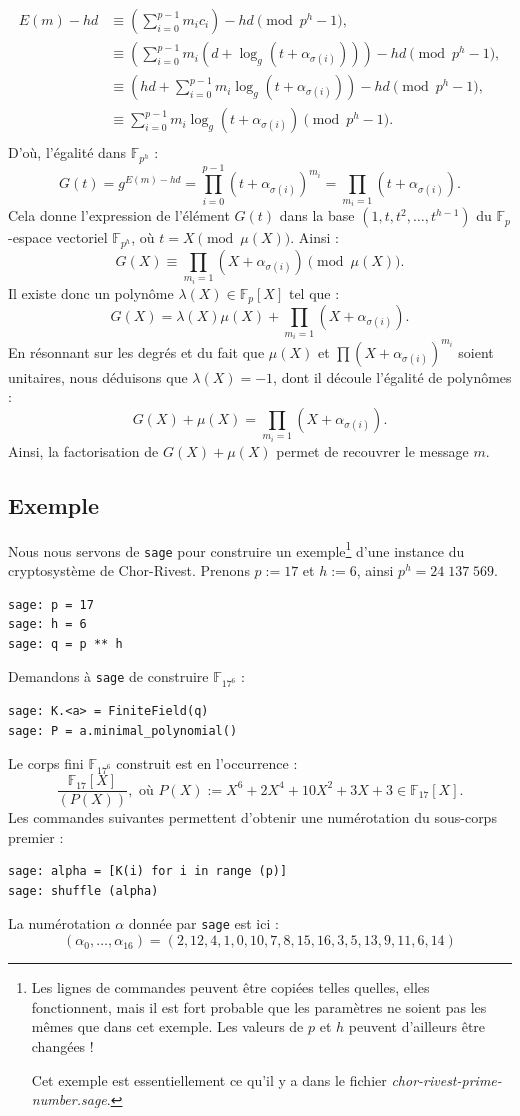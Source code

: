 \documentclass[a4paper, titlepage, 11pt]{article}
\theoremstyle{definition}
\theoremstyle{remark}
\def\gf #1{\mathbb{F}_{#1}}
\begin{document}
\begin{align*}
E(m) - hd &\equiv \left(\sum_{i=0}^{p-1} m_ic_i\right) - hd \pmod{p^h-1}, \\
&\equiv \left(\sum_{i=0}^{p-1} m_i\left(d + \log_g\left(t + \alpha_{\sigma(i)}\right)\right)\right) - hd \pmod{p^h-1}, \\
&\equiv \left(hd + \sum_{i=0}^{p-1} m_i\log_g\left(t + \alpha_{\sigma(i)}\right)\right) - hd \pmod{p^h-1}, \\
&\equiv  \sum_{i=0}^{p-1} m_i\log_g\left(t + \alpha_{\sigma(i)}\right) \pmod{p^h-1}. \\
\end{align*}
D'où, l'égalité dans $\gf{p^h}$ :
$$G(t) = g^{E(m) - hd} = \prod_{i=0}^{p-1} \left(t+\alpha_{\sigma(i)}\right)^{m_i} = \prod_{m_i = 1} \left(t+\alpha_{\sigma(i)}\right).$$
Cela donne l'expression de l'élément $G(t)$ dans la base $(1,t,t^2, \dots, t^{h-1})$ du $\gf{p}$-espace vectoriel $\gf{p^h}$, où $t = X \pmod{\mu(X)}$. Ainsi :
$$G(X) \equiv \prod_{m_i = 1} \left(X+\alpha_{\sigma(i)}\right) \pmod{\mu(X)}.$$
Il existe donc un polynôme $\lambda(X) \in \gf{p}[X]$ tel que : $$G(X) = \lambda(X) \mu(X) + \prod_{m_i = 1} \left(X+\alpha_{\sigma(i)}\right).$$
En résonnant sur les degrés et du fait que $\mu(X)$ et $\prod \left(X+\alpha_{\sigma(i)}\right)^{m_i}$ soient unitaires, nous déduisons que $\lambda(X) = -1$, dont il découle l'égalité de polynômes :
$$G(X) + \mu(X) = \prod_{m_i = 1} \left(X+\alpha_{\sigma(i)}\right).$$
Ainsi, la factorisation de $G(X)+\mu(X)$ permet de recouvrer le message $m$.

\subsection{Exemple}
Nous nous servons de \verb|sage| pour construire un exemple\footnote{Les lignes de commandes peuvent être copiées telles quelles, elles fonctionnent, mais il est fort probable que les paramètres ne soient pas les mêmes que dans cet exemple. Les valeurs de $p$ et $h$ peuvent d'ailleurs être changées !

Cet exemple est essentiellement ce qu'il y a dans le fichier \textit{chor-rivest-prime-number.sage}.} d'une instance du cryptosystème de Chor-Rivest. Prenons $p := 17$ et $h := 6$, ainsi $p^h = 24\;137\;569$.
\begin{verbatim}
sage: p = 17
sage: h = 6
sage: q = p ** h
\end{verbatim}
Demandons à \verb|sage| de construire $\gf{17^6}$ :
\begin{verbatim}
sage: K.<a> = FiniteField(q)
sage: P = a.minimal_polynomial()
\end{verbatim}
Le corps fini $\gf{17^6}$ construit est en l’occurrence :
$$\frac{\gf{17}[X]}{(P(X))}, \text{ où } P(X) := X^6 + 2X^4 + 10 X^2 +3X +3\in  \gf{17}[X].$$
Les commandes suivantes permettent d'obtenir une numérotation du sous-corps premier :
\begin{verbatim}
sage: alpha = [K(i) for i in range (p)]
sage: shuffle (alpha)
\end{verbatim}
La numérotation $\alpha$ donnée par \verb|sage| est ici :
$$(\alpha_0, \dots, \alpha_{16}) = (2, 12, 4, 1, 0, 10, 7, 8, 15, 16, 3, 5, 13, 9, 11, 6, 14)$$
\end{document}
